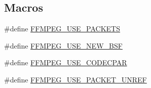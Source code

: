 \subsection*{Macros}
\begin{DoxyCompactItemize}
\item 
\#define \mbox{\hyperlink{ffmpeg-encoder_8h_ad3436376538e16d83df49b6bf62a0c94}{F\+F\+M\+P\+E\+G\+\_\+\+U\+S\+E\+\_\+\+P\+A\+C\+K\+E\+TS}}
\item 
\#define \mbox{\hyperlink{ffmpeg-encoder_8h_a1400074ef58e38594bee82777a2e41da}{F\+F\+M\+P\+E\+G\+\_\+\+U\+S\+E\+\_\+\+N\+E\+W\+\_\+\+B\+SF}}
\item 
\#define \mbox{\hyperlink{ffmpeg-encoder_8h_a23ccf2f20ba897694582d056e740ea56}{F\+F\+M\+P\+E\+G\+\_\+\+U\+S\+E\+\_\+\+C\+O\+D\+E\+C\+P\+AR}}
\item 
\#define \mbox{\hyperlink{ffmpeg-encoder_8h_a4a029b74088b2826754fe72fb21e3d88}{F\+F\+M\+P\+E\+G\+\_\+\+U\+S\+E\+\_\+\+P\+A\+C\+K\+E\+T\+\_\+\+U\+N\+R\+EF}}
\end{DoxyCompactItemize}
